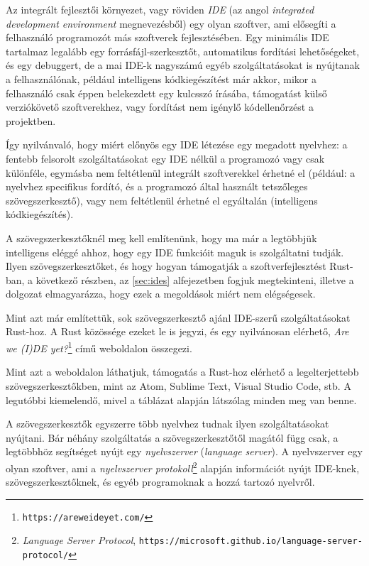 

Az integrált fejlesztői környezet, vagy röviden \emph{IDE} (az angol \emph{integrated development environment} megnevezésből) egy olyan szoftver, ami elősegíti a felhasználó prog\-ra\-mo\-zót más szoftverek fejlesztésében. Egy minimális IDE tartalmaz legalább egy forrásfájl-szerkesztőt, automatikus fordítási lehetőségeket, és egy debuggert, de a mai IDE-k nagyszámú egyéb szolgáltatásokat is nyújtanak a felhasználónak, például intelligens kódkiegészítést már akkor, mikor a felhasználó csak éppen belekezdett egy kulcsszó írásába, támogatást külső verziókövető szoftverekhez, vagy fordítást nem igénylő kód\-el\-le\-nőr\-zést a projektben.

Így nyilvánvaló, hogy miért előnyös egy IDE létezése egy megadott nyelvhez: a fentebb felsorolt szolgáltatásokat egy IDE nélkül a programozó vagy csak különféle, egymásba nem feltétlenül integrált szoftverekkel érhetné el (például: a nyelvhez spe\-ci\-fi\-kus fordító, és a programozó által használt tetszőleges szövegszerkesztő), vagy nem fel\-tét\-le\-nül érhetné el egyáltalán (intelligens kódkiegészítés).

A szövegszerkesztőknél meg kell említenünk, hogy ma már a legtöbbjük intelligens eléggé ahhoz, hogy egy IDE funkcióit maguk is szolgáltatni tudják. Ilyen szö\-veg\-szer\-kesz\-tő\-ket, és hogy hogyan támogatják a szoftverfejlesztést Rust-ban, a következő részben, az \ref{sec:ides} alfejezetben fogjuk megtekinteni, illetve a dolgozat elmagyarázza, hogy ezek a megoldások miért nem elégségesek.

\label{sec:ides}

Mint azt már említettük, sok szövegszerkesztő ajánl IDE-szerű szolgáltatásokat Rust-hoz. A Rust közössége ezeket le is jegyzi, és egy nyilvánosan elérhető, \emph{Are we (I)DE yet?}\footnote{\texttt{https://areweideyet.com/}} című weboldalon összegezi.

Mint azt a weboldalon láthatjuk, támogatás a Rust-hoz elérhető a legelterjettebb szövegszerkesztőkben, mint az Atom, Sublime Text, Visual Studio Code, stb. A leg\-u\-tób\-bi kiemelendő, mivel a táblázat alapján látszólag minden meg van benne.

A szövegszerkesztők egyszerre több nyelvhez tudnak ilyen szolgáltatásokat nyújtani. Bár néhány szolgáltatás a szövegszerkesztőtől magától függ csak, a legtöbbhöz se\-gít\-sé\-get nyújt egy \emph{nyelvszerver} (\emph{language server}). A nyelvszerver egy olyan szoftver, ami a \emph{nyelvszerver protokoll}\footnote{\emph{Language Server Protocol}, \texttt{https://microsoft.github.io/language-server-protocol/}} alapján információt nyújt IDE-knek, szövegszerkesztőknek, és egyéb programoknak a hozzá tartozó nyelvről.

